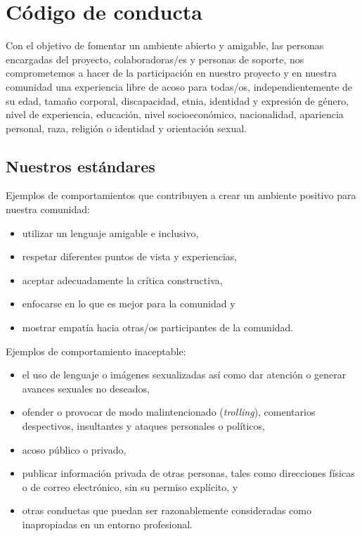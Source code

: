 \chapter{Código de conducta}\label{s:conduct} 
Con el objetivo de fomentar un ambiente abierto y amigable, 
las personas encargadas del proyecto, colaboradoras/es y personas de soporte, 
nos comprometemos a hacer de la participación en nuestro proyecto
y en nuestra comunidad una experiencia libre de acoso para todas/os,
independientemente de su edad, tamaño corporal, discapacidad, etnia,
identidad y expresión de género, nivel de experiencia, educación,
nivel socioeconómico, nacionalidad, apariencia personal, raza,
religión o identidad y orientación sexual.

\section*{Nuestros estándares}

Ejemplos de comportamientos que contribuyen a crear un ambiente positivo
para nuestra comunidad:

\begin{itemize}
\item
  utilizar un lenguaje amigable e inclusivo,
\item
  respetar diferentes puntos de vista y experiencias,
\item
  aceptar adecuadamente la crítica constructiva,
\item
 enfocarse en lo que es mejor para la comunidad y
\item
 mostrar empatía hacia otras/os participantes de la comunidad.
\end{itemize}

\noindent
Ejemplos de comportamiento inaceptable:

\begin{itemize}
\item
  el uso de lenguaje o imágenes sexualizadas así como  
  dar atención o generar avances sexuales no deseados,
\item
  ofender o provocar de modo malintencionado (\emph{trolling}), comentarios despectivos, insultantes y ataques personales o políticos,
\item
 acoso  público o privado,
\item
  publicar información privada de otras personas, tales como direcciones
  físicas o de correo electrónico, sin su permiso explícito, y
\item
  otras conductas que puedan ser razonablemente consideradas
  como inapropiadas en un entorno profesional.
\end{itemize}

